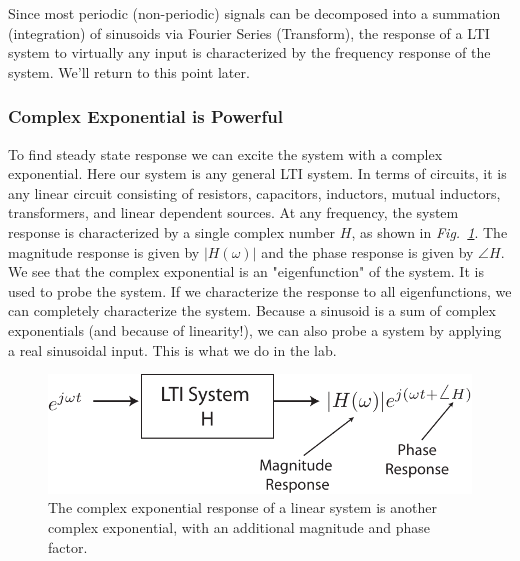 Since most periodic (non-periodic) signals can be decomposed into a summation (integration) of sinusoids via Fourier Series (Transform), the response of a LTI system to virtually any input is characterized by the frequency response of the system.  We'll return to this point later.
\subsubsection{Complex Exponential is Powerful}
To find steady state response we can excite the system with a complex exponential.   Here our system is any general LTI system. In terms of circuits, it is any linear circuit consisting of resistors, capacitors, inductors, mutual inductors, transformers, and linear dependent sources.  At any frequency, the system response is characterized by a single complex number $H$, as shown in \emph{Fig.~\ref{fig:lti_resp}}.   The magnitude response is given by $|H(\omega)|$ and
the phase response is given by $\angle H$.   We see that the complex exponential is an "eigenfunction" of the system.  It is used to probe the system.  If we characterize the response to all eigenfunctions, we can completely characterize the system.   Because a sinusoid is a sum of complex exponentials (and because of linearity!), we can also probe a system by applying a real sinusoidal input.  This is what we do in the lab.
\begin{figure}[tb]
\centering
\includegraphics[width=.65\columnwidth]{lti_resp}
\caption{The complex exponential response of a linear system is another complex exponential, with an additional magnitude and phase factor. }
\label{fig:lti_resp}
\end{figure}
